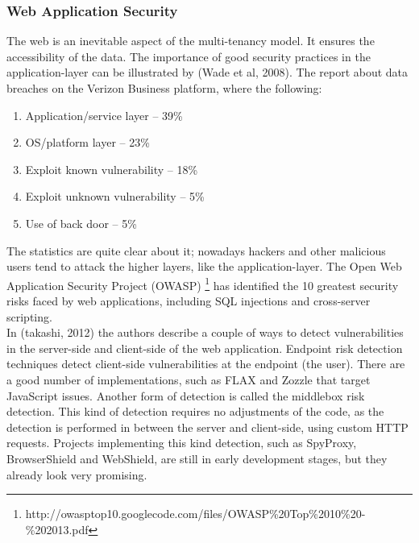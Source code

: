 \subsubsection{Web Application Security}
The web is an inevitable aspect of the multi-tenancy model. It ensures the accessibility of the data. The importance of good security practices in the application-layer can be illustrated by (Wade et al, 2008). The report about data breaches on the Verizon Business platform, where the following:\\
\begin{enumerate}
    \item Application/service layer – 39\%
    \item OS/platform layer – 23\%
    \item Exploit known vulnerability – 18\%
    \item Exploit unknown vulnerability – 5\%
    \item Use of back door – 5\%
\end{enumerate}
The statistics are quite clear about it; nowadays hackers and other malicious users tend to attack the higher layers, like the application-layer. The Open Web Application Security Project (OWASP) \footnote{http://owasptop10.googlecode.com/files/OWASP\%20Top\%2010\%20-\%202013.pdf} has identified the 10 greatest security risks faced by web applications, including SQL injections and cross-server scripting. \\
In (takashi, 2012) the authors describe a couple of ways to detect vulnerabilities in the server-side and client-side of the web application. Endpoint risk detection techniques detect client-side vulnerabilities at the endpoint (the user). There are a good number of implementations, such as FLAX and Zozzle that target JavaScript issues. Another form of detection is called the middlebox risk detection. This kind of detection requires no adjustments of the code, as the detection is performed in between the server and client-side, using custom HTTP requests. Projects implementing this kind detection, such as SpyProxy, BrowserShield and WebShield, are still in early development stages, but they already look very promising.\\

